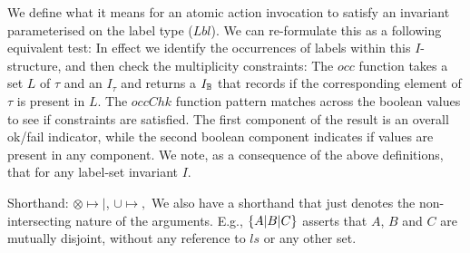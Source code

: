 We define what it means for an atomic action invocation
to satisfy an invariant parameterised on the label type ($Lbl$).
We can re-formulate this as a following equivalent test:
In effect we identify the occurrences of labels within this $I$-structure,
and then check the multiplicity constraints:
The $occ$ function takes a set $L$ of $\tau$ and an $I_\tau$ and returns a $I_{\mathbb{B}}$
that records if the corresponding element of $\tau$ is present in $L$.
The $occChk$ function pattern matches across the boolean values to see if
constraints are satisfied.
The first component of the result is an overall ok/fail indicator,
while the second boolean component indicates if values are present
in any component.
We note, as a consequence of the above definitions, that
for any label-set invariant $I$.


Shorthand: $\otimes \mapsto |$, $\cup \mapsto ,$
We also have a shorthand that just denotes
the non-intersecting nature of the arguments.
E.g.,
$\{A|B|C\}$ asserts that $A$, $B$ and $C$ are mutually disjoint,
without any reference to $ls$ or any other set.

